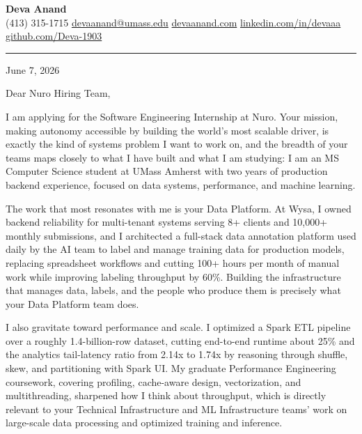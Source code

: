\documentclass[letterpaper,11pt]{article}
\begin{document}
\pagestyle{empty}

\begin{center}
  {\LARGE \bfseries \textcolor{ResumeNavy}{Deva Anand}} \\ \vspace{3pt}
  \small
  (413) 315-1715 \enspace\textbar\enspace
  \href{mailto:devaanand@umass.edu}{devaanand@umass.edu} \enspace\textbar\enspace
  \href{https://devaanand.com}{devaanand.com} \enspace\textbar\enspace
  \href{https://linkedin.com/in/devaaa/}{linkedin.com/in/devaaa} \enspace\textbar\enspace
  \href{https://github.com/Deva-1903}{github.com/Deva-1903}
\end{center}
\vspace{4pt}
{\color{ResumeNavy}\hrule}
\vspace{10pt}

\textcolor{ResumeSlate}{June 7, 2026}

Dear Nuro Hiring Team,

I am applying for the Software Engineering Internship at Nuro. Your mission, making autonomy accessible by building the world's most scalable driver, is exactly the kind of systems problem I want to work on, and the breadth of your teams maps closely to what I have built and what I am studying: I am an MS Computer Science student at UMass Amherst with two years of production backend experience, focused on data systems, performance, and machine learning.

The work that most resonates with me is your Data Platform. At Wysa, I owned backend reliability for multi-tenant systems serving 8+ clients and 10,000+ monthly submissions, and I architected a full-stack data annotation platform used daily by the AI team to label and manage training data for production models, replacing spreadsheet workflows and cutting 100+ hours per month of manual work while improving labeling throughput by 60\%. Building the infrastructure that manages data, labels, and the people who produce them is precisely what your Data Platform team does.

I also gravitate toward performance and scale. I optimized a Spark ETL pipeline over a roughly 1.4-billion-row dataset, cutting end-to-end runtime about 25\% and the analytics tail-latency ratio from 2.14x to 1.74x by reasoning through shuffle, skew, and partitioning with Spark UI. My graduate Performance Engineering coursework, covering profiling, cache-aware design, vectorization, and multithreading, sharpened how I think about throughput, which is directly relevant to your Technical Infrastructure and ML Infrastructure teams' work on large-scale data processing and optimized training and inference.
\end{document}
